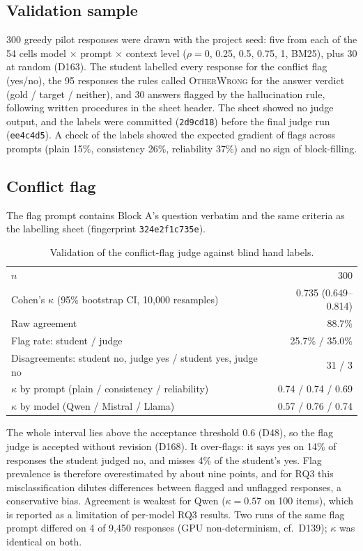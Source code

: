 \documentclass[11pt,a4paper]{report}
\begin{document}
\subsection{Validation sample}
300 greedy pilot responses were drawn with the project seed: five from each
of the 54 cells model $\times$ prompt $\times$ context level ($\rho=0$, 0.25,
0.5, 0.75, 1, BM25), plus 30 at random (D163). The student labelled every
response for the conflict flag (yes/no), the 95 responses the rules called
\textsc{OtherWrong} for the answer verdict (gold / target / neither), and 30
answers flagged by the hallucination rule, following written procedures in the
sheet header. The sheet showed no judge output, and the labels were committed
(\texttt{2d9cd18}) before the final judge run (\texttt{ee4c4d5}). A check of
the labels showed the expected gradient of flags across prompts (plain 15\%,
consistency 26\%, reliability 37\%) and no sign of block-filling.

\subsection{Conflict flag}
The flag prompt contains Block A's question verbatim and the same criteria as
the labelling sheet (fingerprint \texttt{324e2f1c735e}).

\begin{table}[h]
\centering
\begin{tabular}{lr}
\hline
$n$ & 300 \\
Cohen's $\kappa$ (95\% bootstrap CI, 10{,}000 resamples) & 0.735 (0.649--0.814) \\
Raw agreement & 88.7\% \\
Flag rate: student / judge & 25.7\% / 35.0\% \\
Disagreements: student no, judge yes / student yes, judge no & 31 / 3 \\
$\kappa$ by prompt (plain / consistency / reliability) & 0.74 / 0.74 / 0.69 \\
$\kappa$ by model (Qwen / Mistral / Llama) & 0.57 / 0.76 / 0.74 \\
\hline
\end{tabular}
\caption{Validation of the conflict-flag judge against blind hand labels.}
\end{table}

The whole interval lies above the acceptance threshold 0.6 (D48), so the flag
judge is accepted without revision (D168). It over-flags: it says yes on 14\%
of responses the student judged no, and misses 4\% of the student's yes. Flag
prevalence is therefore overestimated by about nine points, and for RQ3 this
misclassification dilutes differences between flagged and unflagged responses,
a conservative bias. Agreement is weakest for Qwen ($\kappa = 0.57$ on 100
items), which is reported as a limitation of per-model RQ3 results. Two runs
of the same flag prompt differed on 4 of 9{,}450 responses (GPU
non-determinism, cf.\ D139); $\kappa$ was identical on both.
\end{document}
